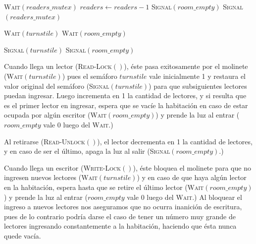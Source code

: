 \documentclass[a4paper,10pt,twoside]{article}
\newenvironment{pseudo}[1][]{%
    \vspace{0.5em}%
    \begin{algorithmic}%
}
{%
    \end{algorithmic}%
    \vspace{0.5em}%
}
\newcommand{\Fn}[2]{\textsc{#1}$(#2)$}
\begin{document}
\begin{pseudo}
        \State \Fn{Wait}{readers\_mutex}
        \State $readers \leftarrow readers - 1$ 
         
            \State \Fn{Signal}{room\_empty} 
        \EndIf
        \State \Fn{Signal}{readers\_mutex}
    \EndProcedure
\end{pseudo}

\begin{pseudo}
        \State \Fn{Wait}{turnstile} 
        \State \Fn{Wait}{room\_empty} 
    \EndProcedure
\end{pseudo}

\begin{pseudo}
        \State \Fn{Signal}{turnstile} 
        \State \Fn{Signal}{room\_empty} 
    \EndProcedure
\end{pseudo}

Cuando llega un lector (\Fn{Read-Lock}{}), éste pasa exitosamente por el molinete (\Fn{Wait}{turnstile}) pues el semáforo $turnstile$ vale inicialmente 1 y restaura el valor original del semáforo (\Fn{Signal}{turnstile}) para que subsiguientes lectores puedan ingresar. Luego incrementa en 1 la cantidad de lectores, y si resulta que es el primer lector en ingresar, espera que se vacíe la habitación en caso de estar ocupada por algún escritor (\Fn{Wait}{room\_empty}) y prende la luz al entrar ($room\_empty$ vale 0 luego del \textsc{Wait}.)

Al retirarse (\Fn{Read-Unlock}{}), el lector decrementa en 1 la cantidad de lectores, y en caso de ser el último, apaga la luz al salir (\Fn{Signal}{room\_empty}.)

Cuando llega un escritor (\Fn{Write-Lock}{}), éste bloquea el molinete para que no ingresen nuevos lectores (\Fn{Wait}{turnstile}) y en caso de que haya algún lector en la habitación, espera hasta que se retire el último lector (\Fn{Wait}{room\_empty}) y prende la luz al entrar ($room\_empty$ vale 0 luego del \textsc{Wait}.) Al bloquear el ingreso a nuevos lectores nos aseguramos que no ocurra inanición de escritura, pues de lo contrario podría darse el caso de tener un número muy grande de lectores ingresando constantemente a la habitación, haciendo que ésta nunca quede vacía.
\end{document}
